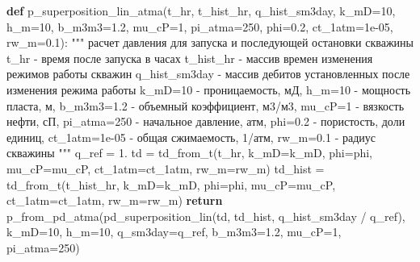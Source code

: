 \documentclass[
  russian,
  letterpaper,
  DIV=11,
  numbers=noendperiod,
  oneside]{scrartcl}
\newenvironment{Shaded}{\begin{snugshade}}{\end{snugshade}}
\newcommand{\CommentTok}[1]{\textcolor[rgb]{0.37,0.37,0.37}{#1}}
\newcommand{\ControlFlowTok}[1]{\textcolor[rgb]{0.00,0.23,0.31}{\textbf{#1}}}
\newcommand{\DecValTok}[1]{\textcolor[rgb]{0.68,0.00,0.00}{#1}}
\newcommand{\FloatTok}[1]{\textcolor[rgb]{0.68,0.00,0.00}{#1}}
\newcommand{\KeywordTok}[1]{\textcolor[rgb]{0.00,0.23,0.31}{\textbf{#1}}}
\newcommand{\NormalTok}[1]{\textcolor[rgb]{0.00,0.23,0.31}{#1}}
\newcommand{\OperatorTok}[1]{\textcolor[rgb]{0.37,0.37,0.37}{#1}}
\begin{document}
\begin{Shaded}
\begin{Highlighting}[]
\KeywordTok{def}\NormalTok{ p\_superposition\_lin\_atma(t\_hr, t\_hist\_hr, q\_hist\_sm3day,}
\NormalTok{                    k\_mD}\OperatorTok{=}\DecValTok{10}\NormalTok{, h\_m}\OperatorTok{=}\DecValTok{10}\NormalTok{, b\_m3m3}\OperatorTok{=}\FloatTok{1.2}\NormalTok{, mu\_cP}\OperatorTok{=}\DecValTok{1}\NormalTok{, pi\_atma}\OperatorTok{=}\DecValTok{250}\NormalTok{, }
\NormalTok{                    phi}\OperatorTok{=}\FloatTok{0.2}\NormalTok{, ct\_1atm}\OperatorTok{=}\FloatTok{1e{-}05}\NormalTok{, rw\_m}\OperatorTok{=}\FloatTok{0.1}\NormalTok{):}
    \CommentTok{"""}
\CommentTok{    расчет давления для запуска и последующей остановки скважины}
\CommentTok{    t\_hr {-} время после запуска в часах}
\CommentTok{    t\_hist\_hr {-} массив времен изменения режимов работы скважин}
\CommentTok{    q\_hist\_sm3day {-} массив дебитов установленных после изменения режима работы}
\CommentTok{    k\_mD=10 {-} проницаемость, мД, }
\CommentTok{    h\_m=10 {-} мощность пласта, м, }
\CommentTok{    b\_m3m3=1.2 {-} объемный коэффициент, м3/м3, }
\CommentTok{    mu\_cP=1 {-} вязкость нефти, сП, }
\CommentTok{    pi\_atma=250 {-} начальное давление, атм, }
\CommentTok{    phi=0.2 {-} пористость, доли единиц, }
\CommentTok{    ct\_1atm=1e{-}05 {-} общая сжимаемость, 1/атм, }
\CommentTok{    rw\_m=0.1 {-} радиус скважины}
\CommentTok{    """}
\NormalTok{    q\_ref }\OperatorTok{=} \FloatTok{1.}
\NormalTok{    td }\OperatorTok{=}\NormalTok{ td\_from\_t(t\_hr, }
\NormalTok{                   k\_mD}\OperatorTok{=}\NormalTok{k\_mD, phi}\OperatorTok{=}\NormalTok{phi, mu\_cP}\OperatorTok{=}\NormalTok{mu\_cP, ct\_1atm}\OperatorTok{=}\NormalTok{ct\_1atm, rw\_m}\OperatorTok{=}\NormalTok{rw\_m)}
\NormalTok{    td\_hist }\OperatorTok{=}\NormalTok{ td\_from\_t(t\_hist\_hr, }
\NormalTok{                        k\_mD}\OperatorTok{=}\NormalTok{k\_mD, phi}\OperatorTok{=}\NormalTok{phi, mu\_cP}\OperatorTok{=}\NormalTok{mu\_cP, }
\NormalTok{                        ct\_1atm}\OperatorTok{=}\NormalTok{ct\_1atm, rw\_m}\OperatorTok{=}\NormalTok{rw\_m)}
    \ControlFlowTok{return}\NormalTok{ p\_from\_pd\_atma(pd\_superposition\_lin(td, td\_hist, q\_hist\_sm3day }\OperatorTok{/}\NormalTok{ q\_ref), }
\NormalTok{                          k\_mD}\OperatorTok{=}\DecValTok{10}\NormalTok{, h\_m}\OperatorTok{=}\DecValTok{10}\NormalTok{, }
\NormalTok{                          q\_sm3day}\OperatorTok{=}\NormalTok{q\_ref, b\_m3m3}\OperatorTok{=}\FloatTok{1.2}\NormalTok{, mu\_cP}\OperatorTok{=}\DecValTok{1}\NormalTok{, pi\_atma}\OperatorTok{=}\DecValTok{250}\NormalTok{)}
\end{Highlighting}
\end{Shaded}
\end{document}

